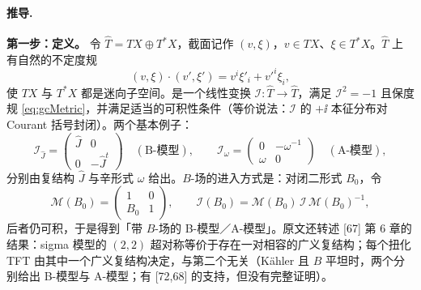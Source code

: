 \paragraph{推导.}

\textbf{第一步：定义。} 令 $\hat T=TX\oplus T^*X$，截面记作 $(v,\xi)$，$v\in TX$、$\xi\in T^*X$。$\hat T$ 上有自然的不定度规
\begin{equation}
(v,\xi)\cdot(v',\xi')=v^i\xi'_i+v'^i\xi_i,
\label{eq:gcMetric}
\end{equation}
使 $TX$ 与 $T^*X$ 都是迷向子空间。是一个线性变换 $\mathcal I:\hat T\to\hat T$，满足 $\mathcal I^2=-1$ 且保度规 \eqref{eq:gcMetric}，并满足适当的可积性条件（等价说法：$\mathcal I$ 的 $+\ii$ 本征分布对 Courant 括号封闭）\pA{}。两个基本例子：
\begin{equation}
\mathcal I_{\hat J}=\begin{pmatrix}\hat J&0\\0&-\hat J^{t}\end{pmatrix}
\quad(\text{B-模型}),
\qquad
\mathcal I_\omega=\begin{pmatrix}0&-\omega^{-1}\\ \omega&0\end{pmatrix}
\quad(\text{A-模型}),
\label{eq:gcExamples}
\end{equation}
分别由复结构 $\hat J$ 与辛形式 $\omega$ 给出\pA{}。$B$-场的进入方式是：对闭二形式 $B_0$，令
\begin{equation}
\mathcal M(B_0)=\begin{pmatrix}1&0\\ B_0&1\end{pmatrix},
\qquad
\mathcal I(B_0)=\mathcal M(B_0)\,\mathcal I\,\mathcal M(B_0)^{-1},
\label{eq:Bfield}
\end{equation}
后者仍可积，于是得到「带 $B$-场的 B-模型／A-模型」\pA{}。原文还转述 [67] 第 6 章的结果：sigma 模型的 $(2,2)$ 超对称等价于存在一对相容的广义复结构；每个扭化 TFT 由其中一个广义复结构决定，与第二个无关（Kähler 且 $B$ 平坦时，两个分别给出 B-模型与 A-模型；有 [72,68] 的支持，但没有完整证明）\pA{}。

